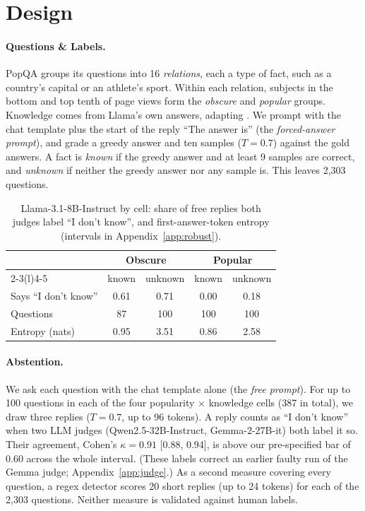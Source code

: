 \documentclass[letterpaper]{article} %
\newcommand{\idk}{``I don't know''}
\begin{document}
\section{Design}

\paragraph{Questions \& Labels.}
PopQA \citep{mallen2023popqa} groups its questions into 16 \emph{relations}, each a type of fact, such as a country's capital or an athlete's sport. Within each relation, subjects in the bottom and top tenth of page views form the \emph{obscure} and \emph{popular} groups. Knowledge comes from Llama's own answers, adapting \citet{gekhman2024finetuning}. We prompt with the chat template plus the start of the reply ``The answer is'' (the \emph{forced-answer prompt}), and grade a greedy answer and ten samples ($T = 0.7$) against the gold answers. A fact is \emph{known} if the greedy answer and at least 9 samples are correct, and \emph{unknown} if neither the greedy answer nor any sample is. This leaves 2,303 questions.

\begin{table}[t]
\centering
\small
\setlength{\tabcolsep}{1.3mm}
\begin{tabular}{@{}lcccc@{}}
\toprule
 & \multicolumn{2}{c}{Obscure} & \multicolumn{2}{c}{Popular} \\
\cmidrule(lr){2-3}\cmidrule(l){4-5}
 & known & unknown & known & unknown \\
\midrule
Says \idk & 0.61 & 0.71 & 0.00 & 0.18 \\
Questions & 87 & 100 & 100 & 100 \\
Entropy (nats) & 0.95 & 3.51 & 0.86 & 2.58 \\
\bottomrule
\end{tabular}
\caption{Llama-3.1-8B-Instruct by cell: share of free replies both judges label \idk, and first-answer-token entropy (intervals in Appendix~\ref{app:robust}).}
\label{tab:cells}
\end{table}

\paragraph{Abstention.}
We ask each question with the chat template alone (the \emph{free prompt}). For up to 100 questions in each of the four popularity $\times$ knowledge cells (387 in total), we draw three replies ($T = 0.7$, up to 96 tokens). A reply counts as \idk{} when two LLM judges (Qwen2.5-32B-Instruct, Gemma-2-27B-it) both label it so. Their agreement, Cohen's $\kappa = 0.91$ [0.88, 0.94], is above our pre-specified bar of 0.60 across the whole interval. (These labels correct an earlier faulty run of the Gemma judge; Appendix~\ref{app:judge}.) As a second measure covering every question, a regex detector scores 20 short replies (up to 24 tokens) for each of the 2,303 questions. Neither measure is validated against human labels.
\end{document}
